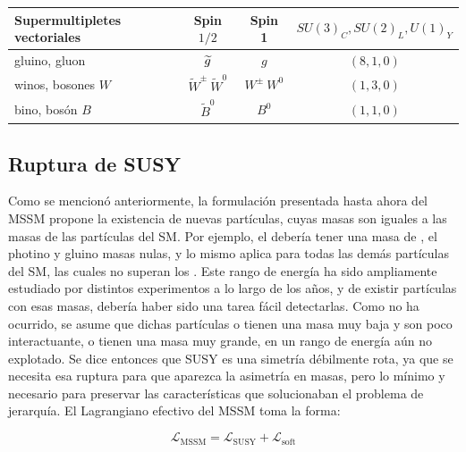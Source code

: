 \begin{table}
	\begin{tabular}{ l c | c c c}

		\hline
		\hline

		\multicolumn{2}{l|}{Supermultipletes vectoriales} & Spin $1/2$ & Spin 1 & $SU(3)_C, SU(2)_L, U(1)_Y$ \\

		\hline
		\hline

		\multicolumn{2}{l|}{gluino, gluon} & $\widetilde{g}$ & $g$ & $(8, 1, 0)$ \\ [1ex]
		\multicolumn{2}{l|}{winos, bosones $W$} & $\widetilde{W}^{\pm}\ \widetilde{W}^{0}$ & $W^{\pm}\ W^0$ & $(1, 3, 0)$ \\ [1ex]
		\multicolumn{2}{l|}{bino, bosón $B$} & $\widetilde{B}^0$ & $B^0$ & $(1, 1, 0)$ \\ [1ex]

		\hline
		\hline

	\end{tabular}
	\renewcommand{\arraystretch}{1}

	\label{tab:mssm_particles}

\end{table}


\subsection{Ruptura de SUSY}

Como se mencionó anteriormente, la formulación presentada hasta ahora del MSSM propone la existencia de nuevas partículas, cuyas masas son iguales a las masas de las partículas del SM. Por ejemplo, el \selL debería tener una masa de , el photino y gluino masas nulas, y lo mismo aplica para todas las demás partículas del SM, las cuales no superan los . Este rango de energía ha sido ampliamente estudiado por distintos experimentos a lo largo de los años, y de existir partículas con esas masas, debería haber sido una tarea fácil detectarlas. Como no ha ocurrido, se asume que dichas partículas o tienen una masa muy baja y son poco interactuante, o tienen una masa muy grande, en un rango de energía aún no explotado. Se dice entonces que SUSY es una simetría débilmente rota, ya que se necesita esa ruptura para que aparezca la asimetría en masas, pero lo mínimo y necesario para preservar las características que solucionaban el problema de jerarquía. El Lagrangiano efectivo del MSSM toma la forma:

\begin{equation}
	\mathcal{L}_{\text{MSSM}} = \mathcal{L}_{\text{SUSY}} + \mathcal{L}_{\text{soft}} 
	\label{eq:l_susy}
\end{equation}


